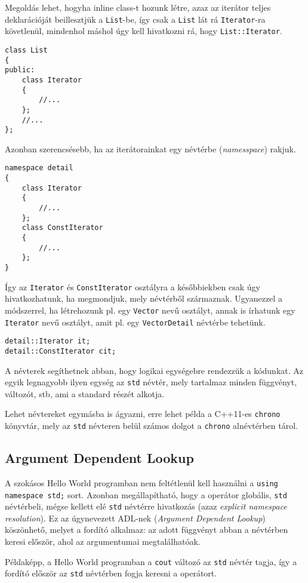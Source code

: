 \documentclass[../cpp_book/cpp_book.tex]{subfiles}
\begin{document}
	Megoldás lehet, hogyha inline class-t hozunk létre, azaz az iterátor teljes deklarációját beillesztjük a \texttt{List}-be, így csak a \texttt{List} lát rá \texttt{Iterator}-ra követlenül, mindenhol máshol úgy kell hivatkozni rá, hogy \texttt{List::Iterator}.
	\begin{lstlisting}
class List
{
public:
	class Iterator
	{
		//...
	};
	//...
};
	\end{lstlisting}
	
	Azonban szerencsésebb, ha az iterátorainkat egy névtérbe (\textit{namesspace}) rakjuk.
\begin{lstlisting}
namespace detail
{
	class Iterator
	{
		//...
	};
	class ConstIterator
	{
		//...
	};
}
\end{lstlisting}
	Így az \texttt{Iterator} és \texttt{ConstIterator} osztályra a későbbiekben csak úgy hivatkozhatunk, ha megmondjuk, mely névtérből származnak. Ugyanezzel a módszerrel, ha létrehozunk pl. egy \texttt{Vector} nevű osztályt, annak is írhatunk egy \texttt{Iterator} nevű osztályt, amit pl. egy \texttt{VectorDetail} névtérbe tehetünk.
	\begin{lstlisting}
detail::Iterator it;
detail::ConstIterator cit;
	\end{lstlisting}

	A névterek segíthetnek abban, hogy logikai egységebre rendezzük a kódunkat. Az egyik legnagyobb ilyen egység az \texttt{std} névtér, mely tartalmaz minden függvényt, változót, stb, ami a standard részét alkotja. 
	
	Lehet névtereket egymásba is ágyazni, erre lehet példa a C++11-es \texttt{chrono} könyvtár, mely az \texttt{std} névteren belül számos dolgot a \texttt{chrono} alnévtérben tárol.
	\subsection{Argument Dependent Lookup}
	A szokásos Hello World programban nem feltétlenül kell használni a \texttt{using namespace std;} sort. Azonban megállapítható, hogy a \texttt{\<} operátor globális, \texttt{std} névtérbeli, mégse kellett elé \texttt{std} névtérre hivatkozás (azaz \textit{explicit namespace resolution}). Ez az úgynevezett ADL-nek (\textit{Argument Dependent Lookup}) köszönhető, melyet a fordító alkalmaz: az adott függvényt abban a névtérben keresi először, ahol az argumentumai megtalálhatóak.
	
	\smallskip
	Példaképp, a Hello World programban a \texttt{cout} változó az \texttt{std} névtér tagja, így a fordító először az \texttt{std} névtérben fogja keresni a \texttt{\<} operátort.
\end{document}
